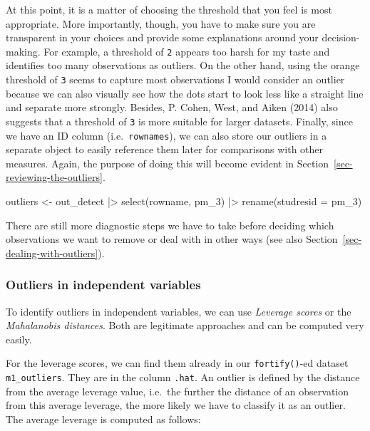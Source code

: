 \documentclass[
  letterpaper,
  DIV=11,
  numbers=noendperiod]{scrreprt}
\newenvironment{Shaded}{\begin{snugshade}}{\end{snugshade}}
\newcommand{\AttributeTok}[1]{\textcolor[rgb]{0.40,0.45,0.13}{#1}}
\newcommand{\FunctionTok}[1]{\textcolor[rgb]{0.28,0.35,0.67}{#1}}
\newcommand{\NormalTok}[1]{\textcolor[rgb]{0.00,0.23,0.31}{#1}}
\newcommand{\OtherTok}[1]{\textcolor[rgb]{0.00,0.23,0.31}{#1}}
\newcommand{\SpecialCharTok}[1]{\textcolor[rgb]{0.37,0.37,0.37}{#1}}
\begin{document}
At this point, it is a matter of choosing the threshold that you feel is
most appropriate. More importantly, though, you have to make sure you
are transparent in your choices and provide some explanations around
your decision-making. For example, a threshold of \texttt{2} appears too
harsh for my taste and identifies too many observations as outliers. On
the other hand, using the orange threshold of \texttt{3} seems to
capture most observations I would consider an outlier because we can
also visually see how the dots start to look less like a straight line
and separate more strongly. Besides, P. Cohen, West, and Aiken (2014)
also suggests that a threshold of \texttt{3} is more suitable for larger
datasets. Finally, since we have an ID column (i.e.~\texttt{rownames}),
we can also store our outliers in a separate object to easily reference
them later for comparisons with other measures. Again, the purpose of
doing this will become evident in
Section~\ref{sec-reviewing-the-outliers}.

\begin{Shaded}
\begin{Highlighting}[]
\NormalTok{outliers }\OtherTok{\textless{}{-}}
\NormalTok{  out\_detect }\SpecialCharTok{|\textgreater{}}
  \FunctionTok{select}\NormalTok{(rowname, pm\_3) }\SpecialCharTok{|\textgreater{}}
  \FunctionTok{rename}\NormalTok{(}\AttributeTok{studresid =}\NormalTok{ pm\_3)}
\end{Highlighting}
\end{Shaded}

There are still more diagnostic steps we have to take before deciding
which observations we want to remove or deal with in other ways (see
also Section~\ref{sec-dealing-with-outliers}).

\subsubsection{Outliers in independent
variables}\label{sec-outliers-in-the-independent-variables}

To identify outliers in independent variables, we can use \emph{Leverage
scores} or the \emph{Mahalanobis distances}. Both are legitimate
approaches and can be computed very easily.

For the leverage scores, we can find them already in our
\texttt{fortify()}-ed dataset \texttt{m1\_outliers}. They are in the
column \texttt{.hat}. An outlier is defined by the distance from the
average leverage value, i.e.~the further the distance of an observation
from this average leverage, the more likely we have to classify it as an
outlier. The average leverage is computed as follows:
\end{document}
